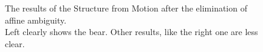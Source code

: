 \begin{figure}[ht]
	 \quad
	\caption{The results of the Structure from Motion after the elimination of affine ambiguity. \\Left clearly shows the bear. Other results, like the right one are less clear.}

	\label{fig:points}
\end{figure}
